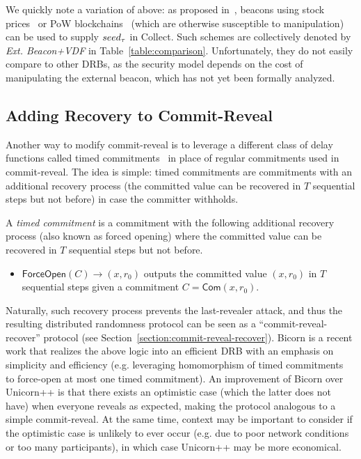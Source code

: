 We quickly note a variation of above: as proposed in~\cite{bunz2017proofs, bonneau2015bitcoin}, beacons using stock prices~\cite{clark2010use} or PoW blockchains~\cite{nakamoto2008bitcoin, bentov2016bitcoin, han2020randchain} (which are otherwise susceptible to manipulation) can be used to supply $seed_\tau$ in Collect. Such schemes are collectively denoted by \textit{Ext. Beacon+VDF} in Table~\ref{table:comparison}.
Unfortunately, they do not easily compare to other DRBs, as the security model depends on the cost of manipulating the external beacon, which has not yet been formally analyzed.

\subsection{Adding Recovery to Commit-Reveal}
Another way to modify commit-reveal is to leverage a different class of delay functions called timed commitments~\cite{boneh2000timed} in place of regular commitments used in commit-reveal.
The idea is simple: timed commitments are commitments with an additional recovery process (the committed value can be recovered in $T$ sequential steps but not before) in case the committer withholds.

\begin{definition}
A \textit{timed commitment} is a commitment with the following additional recovery process (also known as forced opening) where the committed value can be recovered in $T$ sequential steps but not before.
\begin{itemize}
\item $\mathsf{ForceOpen}(C) \rightarrow (x, r_0)$ outputs the committed value $(x, r_0)$ in $T$ sequential steps given a commitment $C = \mathsf{Com}(x, r_0)$.
\end{itemize}
\end{definition}

Naturally, such recovery process prevents the last-revealer attack, and thus the resulting distributed randomness protocol can be seen as a ``commit-reveal-recover'' protocol (see Section~\ref{section:commit-reveal-recover}).
Bicorn is a recent work that realizes the above logic into an efficient DRB with an emphasis on simplicity and efficiency (e.g. leveraging homomorphism of timed commitments~\cite{thyagarajan2021efficient} to force-open at most one timed commitment).
An improvement of Bicorn over Unicorn++ is that there exists an optimistic case (which the latter does not have) when everyone reveals as expected, making the protocol analogous to a simple commit-reveal.
At the same time, context may be important to consider if the optimistic case is unlikely to ever occur (e.g. due to poor network conditions or too many participants), in which case Unicorn++ may be more economical.

